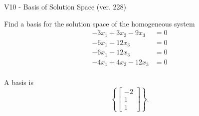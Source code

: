 \begin{exercise}
  \begin{exerciseTitle}V10 - Basis of Solution Space (ver. 228)\end{exerciseTitle}
  \begin{exerciseStatement}
    Find a basis for the solution space of the homogeneous system 
\begin{align*}
 -3 x_ 1 + 3 x_ 2 -9 x_ 3 &= 0  \\ 
  -6 x_ 1 -12 x_ 3 &= 0  \\ 
  -6 x_ 1 -12 x_ 3 &= 0  \\ 
  -4 x_ 1 + 4 x_ 2 -12 x_ 3 &= 0  \\ 
 \end{align*}


 
  \end{exerciseStatement}

  \begin{exerciseAnswer}
   A basis is   
\[\left\{\left[\begin{array}{c}
-2 \\
1 \\
1
\end{array}\right]\right\}.\]

  


  \end{exerciseAnswer}
\end{exercise}